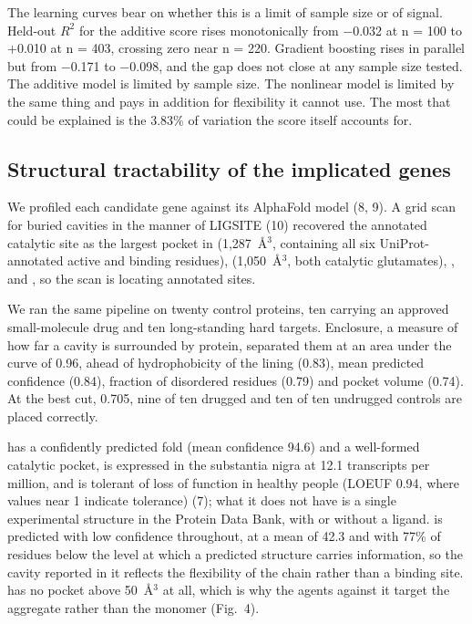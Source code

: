 \documentclass[10pt]{article}
\begin{document}
The learning curves bear on whether this is a limit of sample size or of signal. Held-out $R^2$ for the additive score rises
monotonically from $-$0.032 at n = 100 to +0.010 at n = 403, crossing zero near n = 220. Gradient
boosting rises in parallel but from $-$0.171 to $-$0.098, and the gap does not close at any
sample size tested. The additive model is limited by sample size. The nonlinear model is limited by the same thing and pays in addition for flexibility it cannot use. The most that could be explained is the 3.83\% of variation the score itself accounts for.

\subsection*{Structural tractability of the implicated genes}

We profiled each candidate gene against its AlphaFold model (8, 9). A grid scan for buried cavities in the manner of LIGSITE (10) recovered the
annotated catalytic site as the largest pocket in  (1,287~\AA$^3$, containing all six
UniProt-annotated active and binding residues),  (1,050~\AA$^3$, both catalytic
glutamates), ,  and , so the scan is locating annotated sites.

We ran the same pipeline on twenty control proteins, ten carrying an approved small-molecule drug and ten long-standing hard targets. Enclosure, a measure of how far a cavity is surrounded by protein, separated them at an area under the curve of 0.96, ahead of hydrophobicity of the lining
(0.83), mean predicted confidence (0.84), fraction of disordered residues (0.79) and pocket volume
(0.74). At the best cut, 0.705, nine of ten drugged and ten of ten undrugged controls are placed
correctly.

 has a confidently predicted fold (mean confidence 94.6) and a well-formed catalytic pocket, is expressed in the
substantia nigra at 12.1 transcripts per million, and is tolerant of loss of function in healthy people (LOEUF 0.94, where values near 1 indicate tolerance) (7); what it does not have is a single experimental structure in the Protein Data
Bank, with or without a ligand.  is predicted with low confidence throughout, at a mean of 42.3 and with 77\% of residues below the level at which a predicted structure carries information, so the cavity reported in it reflects the flexibility of the chain rather than a binding site.  has no pocket above 50~\AA$^3$ at all, which is why the agents
against it target the aggregate rather than the monomer (Fig.~4).
\end{document}
